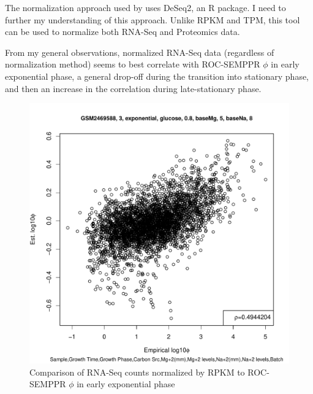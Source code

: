 \documentclass[11pt]{labbook}
\begin{document}
The normalization approach used by \cite{caglar2017} uses DeSeq2, an R package. I need to further my understanding of this approach. Unlike RPKM and TPM, this tool can be used to normalize both RNA-Seq and Proteomics data. 

From my general observations, normalized RNA-Seq data (regardless of normalization method) seems to best correlate with ROC-SEMPPR $\phi$ in early exponential phase, a general drop-off during the transition into stationary phase, and then an increase in the correlation during late-stationary phase. 
\begin{figure}[H]
\centering
\includegraphics[page=1,scale=0.6]{Ecoli_REL606/GSE94117_rpkm.pdf}
\caption{Comparison of RNA-Seq counts normalized by RPKM to ROC-SEMPPR $\phi$ in early exponential phase}
\end{figure}
\end{document}
